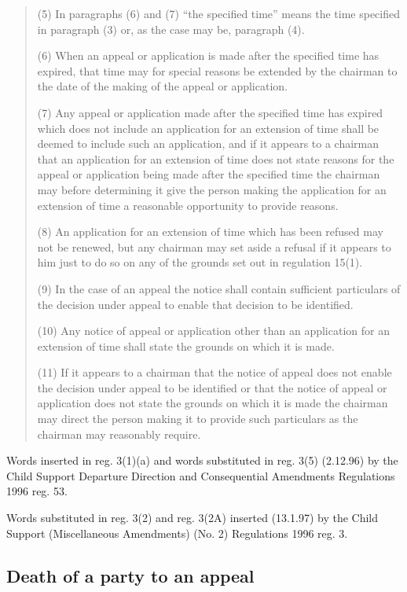 \documentclass[a4paper]{article}
\begin{document}
{\begin{quotation}
(5) In paragraphs (6) and (7) “the specified time” means the time specified in paragraph (3) or, as the case may be, paragraph (4).

(6) When an appeal or application is made after the specified time has expired, that time may for special reasons be extended by the chairman to the date of the making of the appeal or application.

(7) Any appeal or application made after the specified time has expired which does not include an application for an extension of time shall be deemed to include such an application, and if it appears to a chairman that an application for an extension of time does not state reasons for the appeal or application being made after the specified time the chairman may before determining it give the person making the application for an extension of time a reasonable opportunity to provide reasons.

(8) An application for an extension of time which has been refused may not be renewed, but any chairman may set aside a refusal if it appears to him just to do so on any of the grounds set out in regulation 15(1).

(9) In the case of an appeal the notice shall contain sufficient particulars of the decision under appeal to enable that decision to be identified.

(10) Any notice of appeal or application other than an application for an extension of time shall state the grounds on which it is made.

(11) If it appears to a chairman that the notice of appeal does not enable the decision under appeal to be identified or that the notice of appeal or application does not state the grounds on which it is made the chairman may direct the person making it to provide such particulars as the chairman may reasonably require.
\end{quotation}

Words inserted in reg. 3(1)(a) and words substituted in reg. 3(5) (2.12.96) by the Child Support Departure Direction and Consequential Amendments Regulations 1996 reg. 53.

Words substituted in reg. 3(2) and reg. 3(2A) inserted (13.1.97) by the Child Support (Miscellaneous Amendments) (No. 2) Regulations 1996 reg. 3.
}

\subsection[3A. Death of a party to an appeal]{Death of a party to an appeal}
\end{document}
